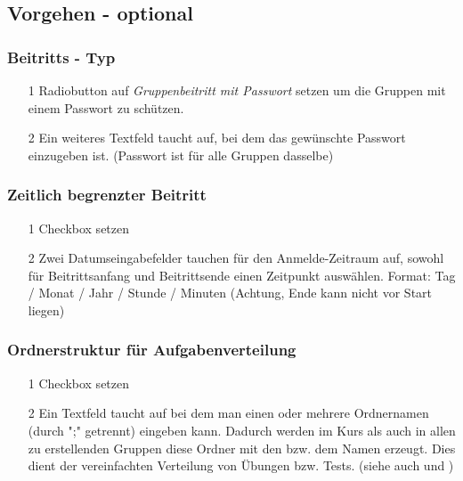 \subsection*{Vorgehen - optional}

\subsubsection*{Beitritts - Typ}
\begin{itemize}
	\item[1] Radiobutton auf  \textit{Gruppenbeitritt mit Passwort}   setzen um die Gruppen mit einem Passwort zu schützen. 
	\item[2] Ein weiteres Textfeld taucht auf, bei dem das gewünschte Passwort einzugeben ist. (Passwort ist für alle Gruppen dasselbe)
\end{itemize}

\subsubsection*{Zeitlich begrenzter Beitritt}
\begin{itemize}
	\item[1] Checkbox setzen 
	\item[2] Zwei Datumseingabefelder tauchen für den Anmelde-Zeitraum auf, sowohl für Beitrittsanfang und Beitrittsende einen Zeitpunkt auswählen. Format: Tag / Monat / Jahr / Stunde / Minuten 
	(Achtung, Ende kann nicht vor Start liegen)
	
\end{itemize}

\subsubsection*{Ordnerstruktur für Aufgabenverteilung}
\begin{itemize}
	\item[1] Checkbox setzen 
	\item[2] Ein Textfeld taucht auf bei dem man einen oder mehrere Ordnernamen (durch ";" getrennt) eingeben kann. Dadurch werden im Kurs als auch in allen zu erstellenden Gruppen diese Ordner mit den bzw. dem Namen erzeugt. Dies dient der vereinfachten Verteilung von Übungen bzw. Tests. (siehe auch  und )
	
\end{itemize}
\clearpage

